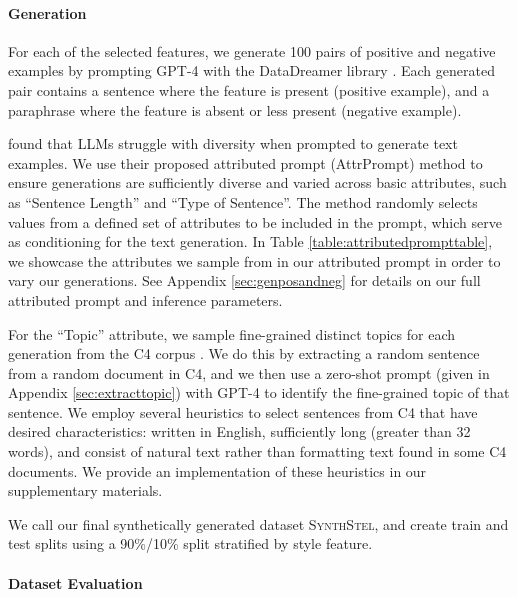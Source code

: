 \stylefeaturecategoriesfig

\paragraph{Generation} %
For each of the selected  features, we generate 100 pairs of positive and negative examples  by prompting GPT-4 \citep{gpt4} with the DataDreamer library \citep{datadreamer}. %
Each generated pair contains a sentence where the feature is present (positive example), and a paraphrase where the feature is absent or less present (negative example). 

\attributedprompttable

\citet{attrprompt} found that LLMs struggle with diversity when prompted to generate text examples.  We use their proposed attributed prompt (AttrPrompt) method to ensure generations are sufficiently diverse and varied across basic attributes, such as ``Sentence Length'' and ``Type of Sentence''. The method randomly selects values from a defined set of attributes to be included in the prompt, which serve as conditioning for the text generation. In Table \ref{table:attributedprompttable}, we showcase the attributes we sample from in our attributed prompt in order to vary our generations. See Appendix \ref{sec:genposandneg} for details on our full attributed prompt and inference parameters.

For the ``Topic'' attribute, we sample fine-grained distinct topics for each generation %
from the C4 corpus \citep{t5andc4}. We do this by extracting a random sentence from a random document in C4, and we then use a zero-shot prompt (given in Appendix \ref{sec:extracttopic}) with GPT-4 to identify the fine-grained topic of that sentence. We employ several heuristics to select sentences from C4 that have desired characteristics: written in English, sufficiently long (greater than 32 words), and consist of natural text rather than formatting text found in some C4 documents. We provide an implementation of these heuristics in our supplementary materials.

We call our final synthetically generated dataset \textsc{SynthStel},  and create train and test splits using a 90\%/10\% split stratified by style feature.

\paragraph{Dataset Evaluation}

